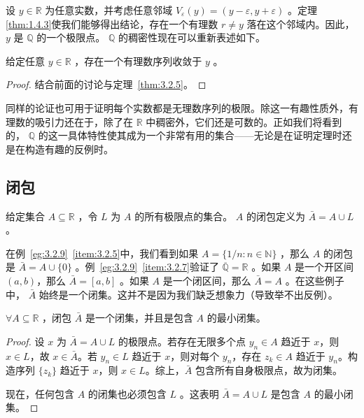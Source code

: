设 \(y \in  \mathbb{R}\) 为任意实数，并考虑任意邻域 \({V}_{\varepsilon }\left( y\right)  = \left( {y - \varepsilon ,y + \varepsilon }\right)\) 。定理\ref{thm:1.4.3}使我们能够得出结论，存在一个有理数 \(r \neq  y\) 落在这个邻域内。因此， \(y\) 是 \(\mathbb{Q}\) 的一个极限点。 \(\mathbb{Q}\) 的稠密性现在可以重新表述如下。

\begin{Thm}
  \label{thm:3.2.10}
  给定任意 \(y \in  \mathbb{R}\) ，存在一个有理数序列收敛于 \(y\) 。
\end{Thm}

\begin{proof}
  结合前面的讨论与定理~\ref{thm:3.2.5}。
\end{proof}

同样的论证也可用于证明每个实数都是无理数序列的极限。除这一有趣性质外，有理数的吸引力还在于，除了在 \(\mathbb{R}\) 中稠密外，它们还是可数的。正如我们将看到的， \(\mathbb{Q}\) 的这一具体特性使其成为一个非常有用的集合——无论是在证明定理时还是在构造有趣的反例时。

\subsection{闭包}
\begin{Def}
  \label{def:3.2.11}
  给定集合 \(A \subseteq  \mathbb{R}\) ，令 \(L\) 为 \(A\) 的所有极限点的集合。 \(A\) 的闭包定义为 \(\bar{A} = A \cup  L\) 。
\end{Def}


在例~\ref{eg:3.2.9}~\ref{item:3.2.5}中，我们看到如果 \(A = \{ 1/n : n \in  \mathbb{N}\}\) ，那么 \(A\) 的闭包是 \(\bar{A} = A \cup  \{ 0\}\) 。例~\ref{eg:3.2.9}~\ref{item:3.2.7}验证了 \(\overline{\mathbb{Q}} = \mathbb{R}\) 。如果 \(A\) 是一个开区间$(a, b)$，那么 \(\bar{A} = \left\lbrack  {a,b}\right\rbrack\) 。如果 \(A\) 是一个闭区间，那么 \(\bar{A} = A\) 。在这些例子中， \(\bar{A}\) 始终是一个闭集。这并不是因为我们缺乏想象力（导致举不出反例）。

\begin{Thm}
  \label{thm:3.2.12}
  \(\forall A \subseteq  \mathbb{R}\) ，闭包 \(\bar{A}\) 是一个闭集，并且是包含 \(A\) 的最小闭集。
\end{Thm}

\begin{proof}
  设 \(x\) 为 \(\bar{A} = A \cup L\) 的极限点。若存在无限多个点 \(y_n \in A\) 趋近于 \(x\)，则 \(x \in L\)，故 \(x \in \bar{A}\)。若 \(y_n \in L\) 趋近于 \(x\)，则对每个 \(y_n\)，存在 \(z_k \in A\) 趋近于 \(y_n\)。构造序列 \(\{z_k\}\) 趋近于 \(x\)，则 \(x \in L\)。综上，\(\bar{A}\) 包含所有自身极限点，故为闭集。

  现在，任何包含 \(A\) 的闭集也必须包含 \(L\) 。这表明 \(\bar{A} = A \cup  L\) 是包含 \(A\) 的最小闭集。
\end{proof}





